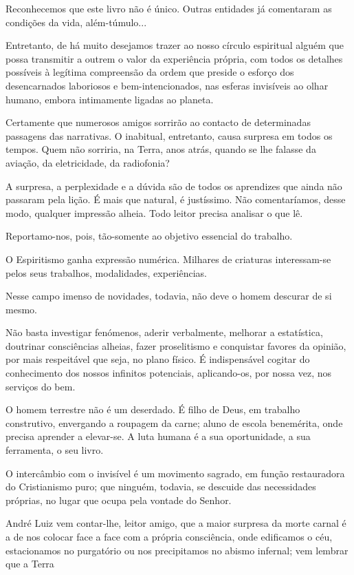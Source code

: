 \documentclass[portuguese,12pt,a4paper]{scrbook}
\begin{document}
	Reconhecemos que este livro não é único. Outras entidades já comentaram as condições da vida, além-túmulo...
	
	Entretanto, de há muito desejamos trazer ao nosso círculo espiritual alguém que possa transmitir a outrem o valor da experiência própria, com todos os detalhes possíveis à legítima compreensão da ordem que preside o esforço dos desencarnados laboriosos e bem-intencionados, nas esferas invisíveis ao olhar humano, embora intimamente ligadas ao planeta.
	
	Certamente que numerosos amigos sorrirão ao contacto de determinadas passagens das narrativas. O inabitual, entretanto, causa surpresa em todos os tempos. Quem não sorriria, na Terra, anos atrás, quando se lhe falasse da aviação, da eletricidade, da radiofonia?
	
	A surpresa, a perplexidade e a dúvida são de todos os aprendizes que ainda não passaram pela lição. É mais que natural, é justíssimo. Não comentaríamos, desse modo, qualquer impressão alheia. Todo leitor precisa analisar o que lê.
	
	Reportamo-nos, pois, tão-somente ao objetivo essencial do trabalho.
	
	O Espiritismo ganha expressão numérica. Milhares de criaturas interessam-se pelos seus trabalhos, modalidades, experiências.
	
	Nesse campo imenso de novidades, todavia, não deve o homem descurar de si mesmo.
	
	Não basta investigar fenómenos, aderir verbalmente, melhorar a estatística, doutrinar consciências alheias, fazer proselitismo e conquistar favores da opinião, por mais respeitável que seja, no plano físico. É indispensável cogitar do conhecimento dos nossos infinitos potenciais, aplicando-os, por nossa vez, nos serviços do bem.
	
	O homem terrestre não é um deserdado. É filho de Deus, em trabalho construtivo, envergando a roupagem da carne; aluno de escola benemérita, onde precisa aprender a elevar-se. A luta humana é a sua oportunidade, a sua ferramenta, o seu livro.
	
	O intercâmbio com o invisível é um movimento sagrado, em função restauradora do Cristianismo puro; que ninguém, todavia, se descuide das necessidades próprias, no lugar que ocupa pela vontade do Senhor.
	
	André Luiz vem contar-lhe, leitor amigo, que a maior surpresa da morte carnal é a de nos colocar face a face com a própria consciência, onde edificamos o céu, estacionamos no purgatório ou nos precipitamos no abismo infernal; vem lembrar que a Terra
	
\end{document}
